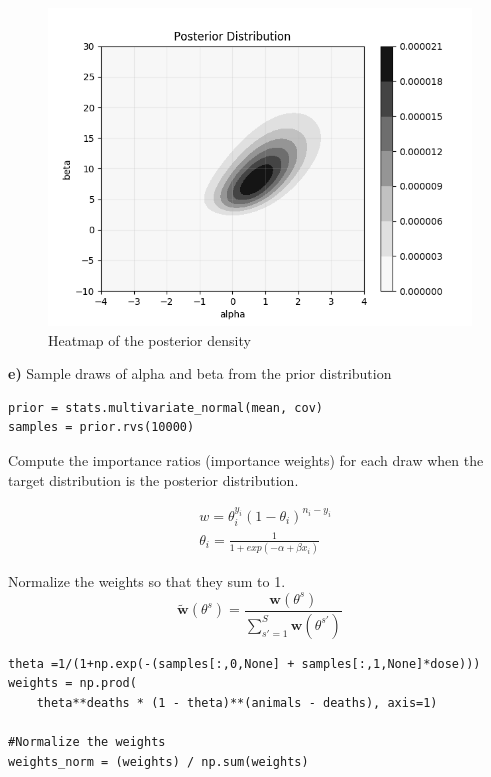 \documentclass{article}
\begin{document}
\begin{figure}[H]
\centering  
\includegraphics[scale=0.6]{log_posterior.png}
\caption{Heatmap of the posterior density}
\label{fig: label}
\end{figure}
 
\textbf{e)} Sample draws of alpha and beta from the prior distribution
\begin{verbatim}     
prior = stats.multivariate_normal(mean, cov)
samples = prior.rvs(10000)
\end{verbatim}
Compute the importance ratios (importance weights) for each draw when the target distribution is the posterior distribution.
 
\begin{equation}
\begin{aligned}
&w=\theta_i^{y_i}(1-\theta_i)^{n_i-y_i}\\
&\theta_i=\frac{1}{1+exp(-{\alpha+\beta x_i})}
\end{aligned}
\end{equation}

Normalize the weights so that they sum to 1.
\begin{equation}
\tilde{\mathbf{w}}(\theta^s)=\frac{\mathbf{w}(\theta^s)}{\sum^S_{s'=1}\mathbf{w}(\theta^{s'})}
\end{equation}
\begin{verbatim}     
theta =1/(1+np.exp(-(samples[:,0,None] + samples[:,1,None]*dose)))
weights = np.prod(
    theta**deaths * (1 - theta)**(animals - deaths), axis=1)
    
#Normalize the weights
weights_norm = (weights) / np.sum(weights)
\end{verbatim}
 
\end{document}
